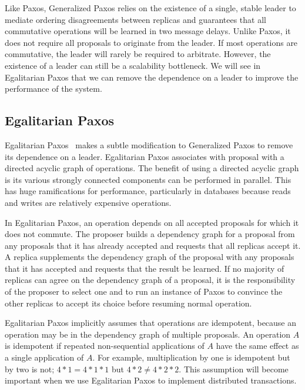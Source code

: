 \documentclass[../main.tex]{subfiles}
\begin{document}
  Like Paxos, Generalized Paxos relies on the existence of a single, stable leader to mediate
  ordering disagreements between replicas and guarantees that all commutative operations will be
  learned in two message delays. Unlike Paxos, it does not require all proposals to originate from
  the leader. If most operations are commutative, the leader will rarely be required to arbitrate.
  However, the existence of a leader can still be a scalability bottleneck. We will see in
  Egalitarian Paxos that we can remove the dependence on a leader to improve the performance of the
  system.

  \subsection{Egalitarian Paxos}
  Egalitarian Paxos~\cite{epaxos} makes a subtle modification to Generalized Paxos to remove its
  dependence on a leader. Egalitarian Paxos associates with proposal with a directed acyclic graph
  of operations. The benefit of using a directed acyclic graph is its various strongly connected
  components can be performed in parallel. This has huge ramifications for performance, particularly
  in databases because reads and writes are relatively expensive operations.

  In Egalitarian Paxos, an operation depends on all accepted proposals for which it does not
  commute. The proposer builds a dependency graph for a proposal from any proposals that it has
  already accepted and requests that all replicas accept it. A replica supplements the dependency
  graph of the proposal with any proposals that it has accepted and requests that the result be
  learned. If no majority of replicas can agree on the dependency graph of a proposal, it is the
  responsibility of the proposer to select one and to run an instance of Paxos to convince the
  other replicas to accept its choice before resuming normal operation.

  Egalitarian Paxos implicitly assumes that operations are idempotent, because an operation may be
  in the dependency graph of multiple proposals. An operation $A$ is idempotent if repeated
  non-sequential applications of $A$ have the same effect as a single application of $A$. For
  example, multiplication by one is idempotent but by two is not; $4 * 1 = 4 * 1 * 1$ but
  $4 * 2 \ne 4 * 2 * 2$. This assumption will become important when we use Egalitarian Paxos to
  implement distributed transactions.

\end{document}

